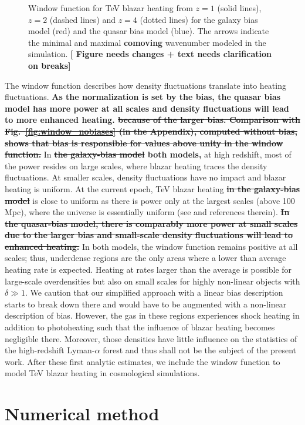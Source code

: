 \documentclass[numberedappendix]{emulateapj}
\newcommand\ALc[1]{{\color{red} \bf #1}} %
\begin{document}
{\begin{figure}[h]
\caption{Window function for TeV blazar heating from $z=1$ (solid lines), $z=2$ (dashed lines) and $z=4$ (dotted lines) for the galaxy bias model (red) and the quasar bias model (blue).  The arrows indicate the minimal and maximal \ALc{comoving} wavenumber modeled in the simulation. \ALc{[{  Figure needs changes + text needs clarification on breaks}]}}
\label{fig:window}
\end{figure}
The window function describes how density fluctuations translate into heating fluctuations. \ALc{As the normalization is set  by the bias, the quasar bias model has more power at all scales and density fluctuations will lead to more enhanced heating. \sout{
 because of the larger bias. Comparison with Fig.~\ref{fig:window_nobiases} (in the Appendix), computed without bias, shows that bias is responsible for values above unity in the window function.}} In \ALc{\sout{the galaxy-bias model} both models,} at high redshift, most of the power resides on large scales, where blazar heating traces the density fluctuations. At smaller scales, density fluctuations have no impact and blazar heating is uniform. At the current epoch, TeV blazar heating \ALc{\sout{in the galaxy-bias model}} is close to uniform as there is power only at the largest scales (above 100 Mpc), where the universe is essentially uniform (see \citet{2013MNRAS.429.2910C} and references therein). \ALc{\sout{In the quasar-bias model, there is comparably more power at small scales due to the larger bias and small-scale density fluctuations will lead to enhanced heating.}} In both models, the window function remains positive at all scales; thus, underdense regions are the only areas where a lower than average heating rate is expected. Heating at rates larger than the average is possible for large-scale overdensities but also on small scales for highly non-linear objects with $\delta\gg1$. We caution that our simplified approach with a linear bias description starts to break down there and would have to be augmented with a non-linear description of bias. However, the gas in these regions experiences shock heating in addition to photoheating such that the influence of blazar heating becomes negligible there. Moreover, those densities have little influence on the statistics of the high-redshift Lyman-$\alpha$ forest and thus shall not be the subject of the present work. After these first analytic estimates, we include the window function to model TeV blazar heating in cosmological simulations.

\section{Numerical method}
}
\end{document}
